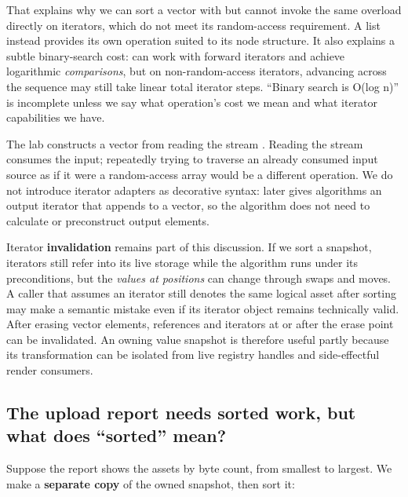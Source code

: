 That explains why we can sort a vector with  but cannot invoke the same overload directly on  iterators, which do not meet its random-access requirement. A list instead provides its own  operation suited to its node structure. It also explains a subtle binary-search cost:  can work with forward iterators and achieve logarithmic \emph{comparisons}, but on non-random-access iterators, advancing across the sequence may still take linear total iterator steps. ``Binary search is O(log n)'' is incomplete unless we say what operation's cost we mean and what iterator capabilities we have.

The lab constructs a vector from  reading the stream . Reading the stream consumes the input; repeatedly trying to traverse an already consumed input source as if it were a random-access array would be a different operation. We do not introduce iterator adapters as decorative syntax:  later gives algorithms an output iterator that appends to a vector, so the algorithm does not need to calculate or preconstruct output elements.

Iterator \textbf{invalidation} remains part of this discussion. If we sort a snapshot, iterators still refer into its live storage while the algorithm runs under its preconditions, but the \emph{values at positions} can change through swaps and moves. A caller that assumes an iterator still denotes the same logical asset after sorting may make a semantic mistake even if its iterator object remains technically valid. After erasing vector elements, references and iterators at or after the erase point can be invalidated. An owning value snapshot is therefore useful partly because its transformation can be isolated from live registry handles and side-effectful render consumers.

\subsection{The upload report needs sorted work, but what does ``sorted'' mean?}\label{05-engine-i-ch006-the-upload-report-needs-sorted-work-but-what-does-sorted-mean}

\hypertarget{05-engine-i-ch006-the-upload-report-needs-sorted-work-but-what-does-sorted-mean}{}

Suppose the report shows the assets by byte count, from smallest to largest. We make a \textbf{separate copy} of the owned snapshot, then sort it:

